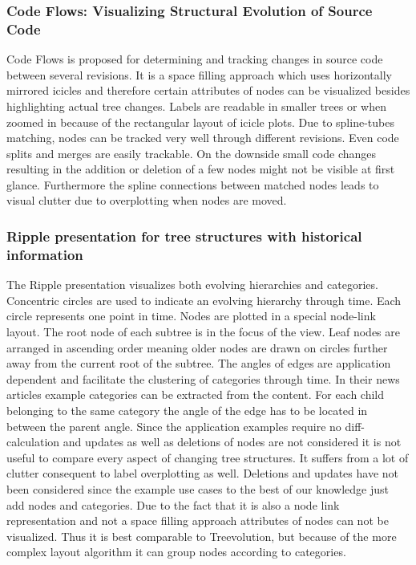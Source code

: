 \subsubsection{Code Flows: Visualizing Structural Evolution of Source Code\cite{telea2008code}}
Code Flows is proposed for determining and tracking changes in source code between several revisions. It is a space filling approach which uses horizontally mirrored icicles and therefore certain attributes of nodes can be visualized besides highlighting actual tree changes. Labels are readable in smaller trees or when zoomed in because of the rectangular layout of icicle plots. Due to spline-tubes matching, nodes can be tracked very well through different revisions. Even code splits and merges are easily trackable. On the downside small code changes resulting in the addition or deletion of a few nodes might not be visible at first glance. Furthermore the spline connections between matched nodes leads to visual clutter due to overplotting when nodes are moved.


\subsubsection{Ripple presentation for tree structures with historical information\cite{ishihara2006ripple}}
The Ripple presentation visualizes both evolving hierarchies and categories. Concentric circles are used to indicate an evolving hierarchy through time. Each circle represents one point in time. Nodes are plotted in a special node-link layout. The root node of each subtree is in the focus of the view. Leaf nodes are arranged in ascending order meaning older nodes are drawn on circles further away from the current root of the subtree. The angles of edges are application dependent and facilitate the clustering of categories through time. In their news articles example categories can be extracted from the content. For each child belonging to the same category the angle of the edge has to be located in between the parent angle. Since the application examples require no diff-calculation and updates as well as deletions of nodes are not considered it is not useful to compare every aspect of changing tree structures. It suffers from a lot of clutter consequent to label overplotting as well. Deletions and updates have not been considered since the example use cases to the best of our knowledge just add nodes and categories. Due to the fact that it is also a node link representation and not a space filling approach attributes of nodes can not be visualized. Thus it is best comparable to Treevolution, but because of the more complex layout algorithm it can group nodes according to categories. 

